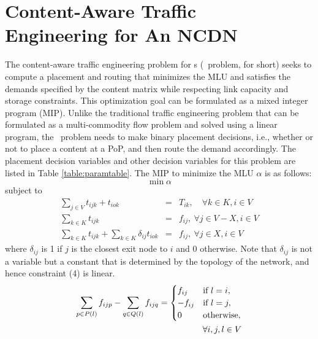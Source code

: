 \section{Content-Aware Traffic\\ Engineering for An NCDN}
\label{sec:optimize}

\label{sec:linearprograms}

The content-aware traffic engineering problem for \ncp s (\ncp\ problem, for short) seeks to compute a placement and routing that minimizes the MLU and satisfies the demands specified by  the content matrix while respecting link capacity and storage constraints. This optimization goal can be formulated as a mixed integer program (MIP). Unlike the traditional traffic engineering problem that can be formulated as a multi-commodity flow problem and solved using a linear program, the \ncp\ problem needs to make binary placement decisions, i.e., whether or not to place a content at a PoP, and then route the demand accordingly. The placement decision variables and other decision variables  for this problem are listed in  Table \ref{table:paramtable}. The MIP to minimize the MLU $\alpha$ is as follows:
\begin{equation}
\min  \alpha
\end{equation}
subject to
\begin{eqnarray}
\sum_{j \in V }  t_{ijk} +   t_{iok} &=& T_{ik}, \quad \forall k \in K, i \in V\\
\sum_{k \in K} t_{ijk} &=& f_{ij} ,  \ \forall j \in V-X, i \in V\\
\sum_{k \in K} t_{ijk} + \sum_{k \in K} \delta_{ij}  t_{iok} &=& f_{ij} ,  \ \forall j \in X, i \in V
\end{eqnarray}
where $\delta_{ij}$ is 1 if $j$ is the closest exit node to $i$ and 0 otherwise. Note that $\delta_{ij}$ is not a variable but a constant that is determined by the topology of the network, and hence constraint (4) is linear.
\begin{eqnarray}
 \sum_{p \in P(l)} f_{ijp} - \sum_{q \in Q(l)}  f_{ijq}  =  \begin{cases}  f_{ij} & \text{if } l=i,  \notag \\
   -f_{ij}  &   \text{if } l=j,  \notag \\
0 & \text{otherwise}, \end{cases}\\
\forall i,j,l \in V
\end{eqnarray}
